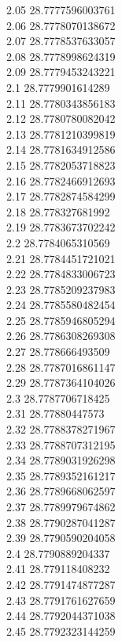 {2.05	28.7777596003761\\
2.06	28.7778070138672\\
2.07	28.7778537633057\\
2.08	28.7778998624319\\
2.09	28.7779453243221\\
2.1	28.7779901614289\\
2.11	28.7780343856183\\
2.12	28.7780780082042\\
2.13	28.7781210399819\\
2.14	28.7781634912586\\
2.15	28.7782053718823\\
2.16	28.7782466912693\\
2.17	28.7782874584299\\
2.18	28.778327681992\\
2.19	28.7783673702242\\
2.2	28.7784065310569\\
2.21	28.7784451721021\\
2.22	28.7784833006723\\
2.23	28.7785209237983\\
2.24	28.7785580482454\\
2.25	28.7785946805294\\
2.26	28.7786308269308\\
2.27	28.778666493509\\
2.28	28.7787016861147\\
2.29	28.7787364104026\\
2.3	28.7787706718425\\
2.31	28.77880447573\\
2.32	28.7788378271967\\
2.33	28.7788707312195\\
2.34	28.7789031926298\\
2.35	28.7789352161217\\
2.36	28.7789668062597\\
2.37	28.7789979674862\\
2.38	28.7790287041287\\
2.39	28.7790590204058\\
2.4	28.7790889204337\\
2.41	28.779118408232\\
2.42	28.7791474877287\\
2.43	28.7791761627659\\
2.44	28.7792044371038\\
2.45	28.7792323144259\\
}
